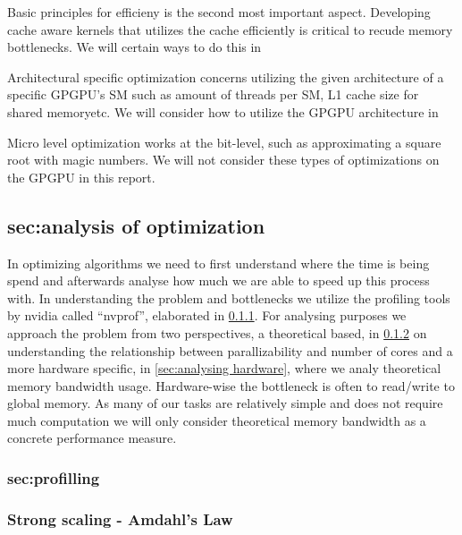 Basic principles for efficieny is the second most important aspect.
Developing cache aware kernels that utilizes the cache efficiently is critical to recude memory bottlenecks.
We will certain ways to do this in 

Architectural specific optimization concerns utilizing the given architecture of a specific GPGPU's SM such as amount of threads per SM, L1 cache size for shared memoryetc.
We will consider how to utilize the GPGPU architecture in 

Micro level optimization works at the bit-level, such as approximating a square root with magic numbers.
We will not consider these types of optimizations on the GPGPU in this report.


\subsection{sec:analysis of optimization}
\label{sec:analysis of optimization}
In optimizing algorithms we need to first understand where the time is being spend and afterwards analyse how much we are able to speed up this process with.
In understanding the problem and bottlenecks we utilize the profiling tools by nvidia called ``nvprof'', elaborated in \cref{sec:profiling}.
For analysing purposes we approach the problem from two perspectives, a theoretical based, in \cref{sec:amdahls law} on understanding the relationship between parallizability and number of cores and a more hardware specific, in \cref{sec:analysing hardware}, where we analy theoretical memory bandwidth usage.
Hardware-wise the bottleneck is often to read/write to global memory.
As many of our tasks are relatively simple and does not require much computation we will only consider theoretical memory bandwidth as a concrete performance measure. 
\label{sec:parallel performance}

\subsubsection{sec:profilling}
\label{sec:profiling}


\subsubsection{Strong scaling - Amdahl's Law}
\label{sec:amdahls law}

